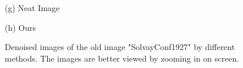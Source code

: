 \documentclass[runningheads]{llncs}
\begin{document}
\begin{figure}
{\begin{minipage}[t]{0.25\textwidth}
{\footnotesize (g) Neat Image}
\end{minipage}
\begin{minipage}[t]{0.25\textwidth}
\centering
{}
{\footnotesize (h) Ours }
\end{minipage}
}\vspace{-0.1in}
\caption{Denoised images of the old image "SolvayConf1927" by different methods. The images are better viewed by zooming in on screen.}
\label{fig9}\vspace{-0.4in}
\end{figure}
  
\end{document}
